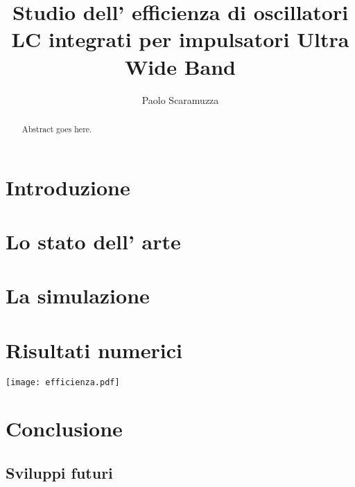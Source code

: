 \documentclass[a4paper]{memoir}
\author{Paolo Scaramuzza}
\title{Studio dell' efficienza di oscillatori LC integrati per impulsatori 
	Ultra Wide Band}
\date{} %
\begin{document}
\cleardoublepage
\newpage

\begin{vplace}[0.7]
\begin{abstract}
Abstract goes here.
\end{abstract}
\end{vplace}

\cleardoublepage
\newpage
\tableofcontents

\cleardoublepage
\chapter{Introduzione}

\cleardoublepage
\chapter{Lo stato dell' arte}

\cleardoublepage
\chapter{La simulazione}
\cite{Razavi11}
\cleardoublepage
\chapter{Risultati numerici}
\texttt{[image: efficienza.pdf]}
\cleardoublepage
\chapter{Conclusione}

\section{Sviluppi futuri}



\end{document}
